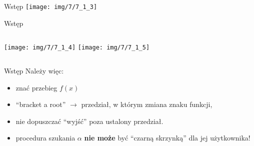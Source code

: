 \begin{frame}{Wstęp}
	\centering \texttt{[image: img/7/7\_1\_3]}
\end{frame}
\begin{frame}{Wstęp}
	\begin{columns}
		\centering   \texttt{[image: img/7/7\_1\_4]}
		\centering   \texttt{[image: img/7/7\_1\_5]}
	\end{columns}
\end{frame}
\begin{frame}{Wstęp}
	Należy więc:
	\begin{itemize}
		\item znać przebieg $f(x)$
		\item ``bracket a root''\newline
			  $\rightarrow$ przedział, w którym zmiana znaku funkcji,
		\item nie dopuszczać ``wyjść'' poza ustalony przedział.
		\item procedura szukania $\alpha$ {\bf nie może} być ``czarną skrzynką'' dla jej użytkownika!
	\end{itemize}
\end{frame}
